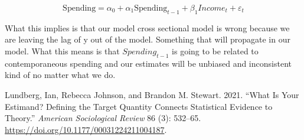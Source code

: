 \documentclass[
  letterpaper,
  DIV=11,
  numbers=noendperiod]{scrreprt}
\newlength{\cslhangindent}
\newenvironment{CSLReferences}[2] %
 {\begin{list}{}{%
  \setlength{\itemindent}{0pt}
  \setlength{\leftmargin}{0pt}
  \setlength{\parsep}{0pt}
  \ifodd #1
   \setlength{\leftmargin}{\cslhangindent}
   \setlength{\itemindent}{-1\cslhangindent}
  \fi
  \setlength{\itemsep}{#2\baselineskip}}}
 {\end{list}}
\begin{document}
\[
\text{Spending} = \alpha_{0} + \alpha_{1} \text{Spending}_{t-1} + \beta_1 Income_{t} + \varepsilon_{t}
\]

What this implies is that our model cross sectional model is wrong
because we are leaving the lag of y out of the model. Something that
will propagate in our model. What this means is that \(Spending_{t-1}\)
is going to be related to contemporaneous spending and our estimates
will be unbiased and inconsistent kind of no matter what we do.

\label{refs}
\begin{CSLReferences}{1}{0}
Lundberg, Ian, Rebecca Johnson, and Brandon M. Stewart. 2021. {``What
{Is Your Estimand}? {Defining} the {Target Quantity Connects Statistical
Evidence} to {Theory}.''} \emph{American Sociological Review} 86 (3):
532--65. \url{https://doi.org/10.1177/00031224211004187}.

\end{CSLReferences}
\end{document}
